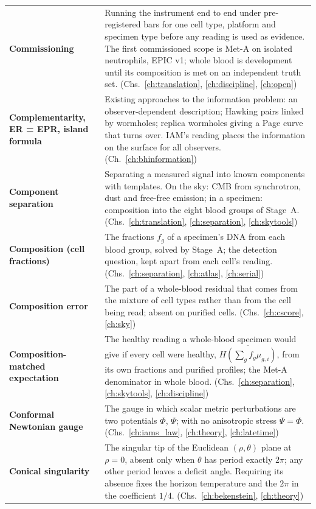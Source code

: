 {\begin{longtable}{@{}>{\raggedright\arraybackslash}p{}>{\raggedright\arraybackslash}p{}@{}}
\textbf{Commissioning} & Running the instrument end to end under pre-registered bars for one cell type, platform and specimen type before any reading is used as evidence. The first commissioned scope is Met-A on isolated neutrophils, EPIC v1; whole blood is development until its composition is met on an independent truth set. {\footnotesize(Chs.~\ref{ch:translation}, \ref{ch:discipline}, \ref{ch:open})}\\[1pt]
\textbf{Complementarity, ER = EPR, island formula} & Existing approaches to the information problem: an observer-dependent description; Hawking pairs linked by wormholes; replica wormholes giving a Page curve that turns over. IAM's reading places the information on the surface for all observers. {\footnotesize(Ch.~\ref{ch:bhinformation})}\\[1pt]
\textbf{Component separation} & Separating a measured signal into known components with templates. On the sky: CMB from synchrotron, dust and free-free emission; in a specimen: composition into the eight blood groups of Stage~A. {\footnotesize(Chs.~\ref{ch:translation}, \ref{ch:separation}, \ref{ch:skytools})}\\[1pt]
\textbf{Composition (cell fractions)} & The fractions $f_g$ of a specimen's DNA from each blood group, solved by Stage~A; the detection question, kept apart from each cell's reading. {\footnotesize(Chs.~\ref{ch:separation}, \ref{ch:atlas}, \ref{ch:serial})}\\[1pt]
\textbf{Composition error} & The part of a whole-blood residual that comes from the mixture of cell types rather than from the cell being read; absent on purified cells. {\footnotesize(Chs.~\ref{ch:cscore}, \ref{ch:sky})}\\[1pt]
\textbf{Composition-matched expectation} & The healthy reading a whole-blood specimen would give if every cell were healthy, $\overline{H(\sum_gf_g\mu_{g,i})}$, from its own fractions and purified profiles; the Met-A denominator in whole blood. {\footnotesize(Chs.~\ref{ch:separation}, \ref{ch:skytools}, \ref{ch:discipline})}\\[1pt]
\textbf{Conformal Newtonian gauge} & The gauge in which scalar metric perturbations are two potentials $\Phi$, $\Psi$; with no anisotropic stress $\Psi=\Phi$. {\footnotesize(Chs.~\ref{ch:iams_law}, \ref{ch:theory}, \ref{ch:latetime})}\\[1pt]
\textbf{Conical singularity} & The singular tip of the Euclidean $(\rho,\theta)$ plane at $\rho=0$, absent only when $\theta$ has period exactly $2\pi$; any other period leaves a deficit angle. Requiring its absence fixes the horizon temperature and the $2\pi$ in the coefficient $1/4$. {\footnotesize(Chs.~\ref{ch:bekenstein}, \ref{ch:theory})}\\[1pt]

\end{longtable}}
